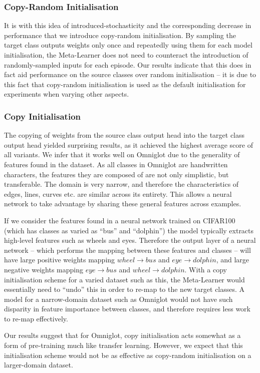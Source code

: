\documentclass{report}
\begin{document}
\subsubsection{Copy-Random Initialisation}
It is with this idea of introduced-stochasticity and the corresponding decrease in performance that we introduce copy-random initialisation. By sampling the target class outputs weights only once and repeatedly using them for each model initialisation, the Meta-Learner does not need to counteract the introduction of randomly-sampled inputs for each episode. Our results indicate that this does in fact aid performance on the source classes over random initialisation -- it is due to this fact that copy-random initialisation is used as the default initialisation for experiments when varying other aspects.

\subsubsection{Copy Initialisation}
The copying of weights from the source class output head into the target class output head yielded surprising results, as it achieved the highest average score of all variants. We infer that it works well on Omniglot due to the generality of features found in the dataset. As all classes in Omniglot are handwritten characters, the features they are composed of are not only simplistic, but transferable. The domain is very narrow, and therefore the characteristics of edges, lines, curves etc. are similar across its entirety. This allows a neural network to take advantage by sharing these general features across examples. \par
If we consider the features found in a neural network trained on CIFAR100 (which has classes as varied as ``bus'' and ``dolphin'') the model typically extracts high-level features such as wheels and eyes\parencite{deepvis}. Therefore the output layer of a neural network -- which performs the mapping between these features and classes -- will have large positive weights mapping $wheel\rightarrow bus$ and $eye\rightarrow dolphin$, and large negative weights mapping $eye\rightarrow bus$ and $wheel\rightarrow dolphin$. With a copy initialisation scheme for a varied dataset such as this, the Meta-Learner would essentially need to ``undo'' this in order to re-map to the new target classes. A model for a narrow-domain dataset such as Omniglot would not have such disparity in feature importance between classes, and therefore requires less work to re-map effectively. \par
Our results suggest that for Omniglot, copy initialisation acts somewhat as a form of pre-training much like transfer learning. However, we expect that this initialisation scheme would not be as effective as copy-random initialisation on a larger-domain dataset.
\end{document}
